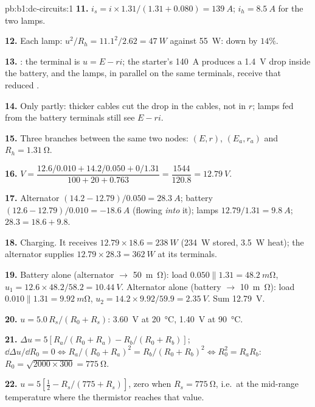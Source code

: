 \begin{solution}{pb:b1:dc-circuits:1}
\textbf{11.} $i_s = i \times 1.31/(1.31 + 0.080) = \qty{139}{A}$; $i_h =
\qty{8.5}{A}$ for the two lamps.

\textbf{12.} Each lamp: $u^2/R_h = 11.1^2/2.62 = \qty{47}{W}$ against
\qty{55}{W}: down by $14\%$.

\textbf{13.} : the terminal  is $u = E - ri$; the
starter's \qty{140}{A} produces a \qty{1.4}{V} drop inside the battery,
and the lamps, in parallel on the same terminals, receive that reduced
.

\textbf{14.} Only partly: thicker cables cut the drop in the cables,
not in $r$; lamps fed from the battery terminals still see $E - ri$.

\textbf{15.} Three branches between the same two nodes: $(E, r)$,
$(E_a, r_a)$ and $R_h = \qty{1.31}{\ohm}$.

\textbf{16.} $V = \dfrac{12.6/0.010 + 14.2/0.050 + 0/1.31}{100 + 20 + 0.763}
= \dfrac{1544}{120.8} = \qty{12.79}{V}$.

\textbf{17.} Alternator $(14.2 - 12.79)/0.050 = \qty{28.3}{A}$; battery
$(12.6 - 12.79)/0.010 = \qty{-18.6}{A}$ (flowing \emph{into} it); lamps
$12.79/1.31 = \qty{9.8}{A}$; $28.3 = 18.6 + 9.8$.

\textbf{18.} Charging. It receives $12.79 \times 18.6 = \qty{238}{W}$
(\qty{234}{W} stored, \qty{3.5}{W} heat); the alternator supplies
$12.79 \times 28.3 = \qty{362}{W}$ at its terminals.

\textbf{19.} Battery alone (alternator $\to$ \qty{50}{m\ohm}): load
$0.050 \parallel 1.31 = \qty{48.2}{m\ohm}$, $u_1 = 12.6 \times 48.2/58.2 =
\qty{10.44}{V}$. Alternator alone (battery $\to$ \qty{10}{m\ohm}): load
$0.010 \parallel 1.31 = \qty{9.92}{m\ohm}$, $u_2 = 14.2 \times 9.92/59.9 =
\qty{2.35}{V}$. Sum \qty{12.79}{V}.

\textbf{20.} $u = 5.0\,R_s/(R_0 + R_s)$: \qty{3.60}{V} at
\qty{20}{\degreeCelsius}, \qty{1.40}{V} at \qty{90}{\degreeCelsius}.

\textbf{21.} $\Delta u = 5[R_a/(R_0 + R_a) - R_b/(R_0 + R_b)]$;
$\dd\Delta u/\dd R_0 = 0 \Leftrightarrow R_a/(R_0 + R_a)^2 = R_b/(R_0 +
R_b)^2 \Leftrightarrow R_0^2 = R_aR_b$: $R_0 = \sqrt{2000 \times 300} =
\qty{775}{\ohm}$.

\textbf{22.} $u = 5[\tfrac12 - R_s/(775 + R_s)]$, zero when $R_s =
\qty{775}{\ohm}$, i.e.\ at the mid-range temperature where the
thermistor reaches that value.


\end{solution}
